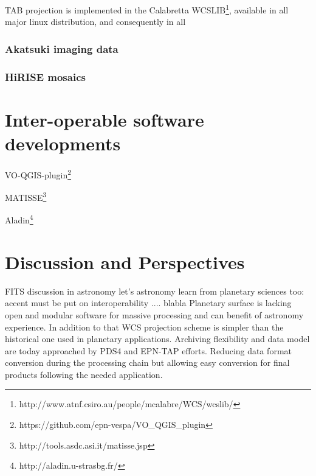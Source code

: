 TAB projection is implemented in the Calabretta WCSLIB\footnote{http://www.atnf.csiro.au/people/mcalabre/WCS/wcslib/},
available in all major linux distribution, and consequently in all 

\subsubsection{Akatsuki imaging data}

\subsubsection{HiRISE mosaics}

\section{Inter-operable software developments}
\label{sec:softdev}
VO-QGIS-plugin\footnote{https://github.com/epn-vespa/VO\_QGIS\_plugin}

MATISSE\footnote{http://tools.asdc.asi.it/matisse.jsp} \citep{ZINZI2016}

Aladin\footnote{http://aladin.u-strasbg.fr/}

\section{Discussion and Perspectives}
\label{sec:disc}
FITS discussion in astronomy\citep{THOMAS2015133} 
let's astronomy learn from planetary sciences too: accent must be put on interoperability
.... blabla
Planetary surface is lacking open and modular software for massive processing and can benefit
of astronomy experience. In addition to that WCS projection scheme is simpler than the
historical one used in planetary applications. 
Archiving flexibility and data model are today approached by PDS4 and EPN-TAP efforts.
Reducing data format conversion during the processing chain but
allowing easy conversion for final products following the needed application.

%
%
%
%


